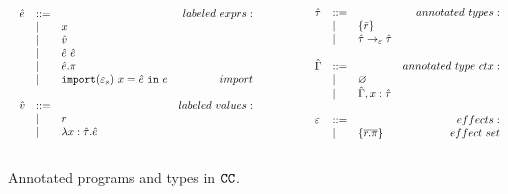 \begin{figure}
\vspace{-0.6cm}
\[
\begin{array}{lll}

\begin{array}{lllr}

\hat e & ::= & ~ & labeled~exprs: \\
	& | & x \\
	& | & \hat v \\
	& | & \hat e ~ \hat e \\
	& | & \hat e.\pi \\
	& | & \mathtt{import}(\varepsilon_s)~x = \hat e~\mathtt{in}~e & import \\
	&&\\

\hat v & ::= & ~ & labeled~values: \\
	& | & r \\
	& | & \lambda x: \hat \tau.\hat e \\
	&&\\

\end{array}

& ~~~~~~~~&

\begin{array}{lllr}

\hat \tau & ::= & ~ & annotated ~types: \\
		& | & \{ \bar r \} \\
		& | & \hat \tau \rightarrow_{\varepsilon} \hat \tau \\
		&&\\

\hat \Gamma & ::= & ~ & annotated~type~ctx:\\
				& | & \varnothing \\
				& | & \hat \Gamma, x: \hat \tau \\
				&&\\

\varepsilon & ::= & ~ & effects: \\
		& | & \{ \overline{r.\pi} \} & effect~set \\
		&&\\

\end{array}

\end{array}
\]
\vspace{-0.6cm}
\caption{Annotated programs and types in $\mathtt{CC}$.}
\vspace{-0.6cm}
\label{fig:epscalc_annotated_grammar}
\end{figure}

